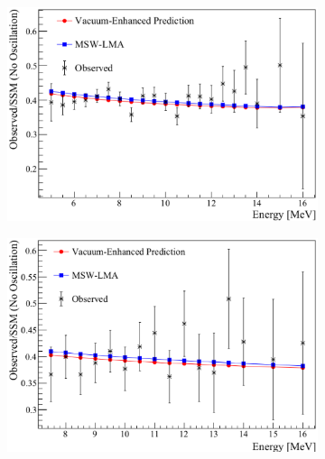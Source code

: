 \begin{figure}[htbp]
  \centering
\begin{subfigure}[b]{0.48\textwidth}
    \centering
    \includegraphics[width=\textwidth]{kamland_superk_1}
    \caption[]{}
  \end{subfigure}
  \hfill
\begin{subfigure}[b]{0.48\textwidth}
    \centering
    \includegraphics[width=\textwidth]{kamland_superk_2}
    \caption[]{}
  \end{subfigure}


\end{figure}
